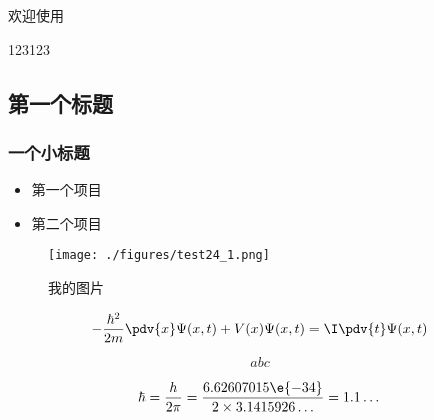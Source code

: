 
欢迎使用

123123

\subsection{第一个标题}
\subsubsection{一个小标题}

\begin{itemize}
\item 第一个项目
\item 第二个项目
\end{itemize}

\begin{figure}[ht]
\centering
\texttt{[image: ./figures/test24\_1.png]}
\caption{我的图片} \label{test24_fig1}
\end{figure}

\begin{equation}
-\frac{\hbar^2}{2m} \pdv{x} \Psi(x, t) + V(x) \Psi(x,t) = \I\pdv{t}\Psi(x,t)
\end{equation}

\begin{equation}
abc
\end{equation}

\begin{equation}
\hbar = \frac{h}{2\pi} = \frac{6.62607015\e{-34}}{2\times 3.1415926\dots} = 1.1\dots
\end{equation}
